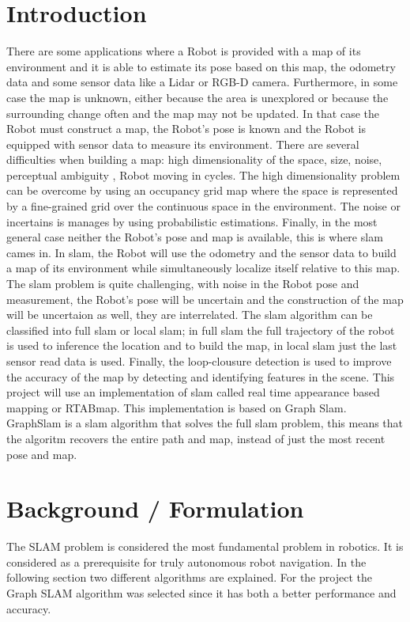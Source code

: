 \documentclass[10pt,journal,compsoc]{IEEEtran}
\begin{document}
\section{Introduction}
\label{sec:introduction}
\IEEEPARstart
{T}{here} are some applications where a Robot is provided with a map of its environment and it is able to estimate its pose based on this map, the odometry data and some sensor data like a Lidar or RGB-D camera. Furthermore, in some case the map is unknown, either because the area is unexplored or because the surrounding change often and the map may not be updated. In that case the Robot must construct a map, the Robot's pose is known and the Robot is equipped with sensor data to measure its environment. There are several difficulties when building a map: high dimensionality of the space, size, noise, perceptual ambiguity , Robot moving in cycles. The  high dimensionality problem can be overcome by using an occupancy grid map where the space is represented by a fine-grained grid over the continuous space in the environment. The noise or incertains is manages by using probabilistic estimations. Finally, in the most general case neither the Robot's pose and map is available, this is where slam cames in. In slam, the Robot will use the odometry and the sensor data to build a map of its environment while simultaneously localize itself relative to this map. The slam problem is quite challenging, with noise in the Robot pose and measurement, the Robot's pose will be uncertain and the construction of the map will be uncertaion as well, they are interrelated. The slam algorithm can be classified into full slam or local slam; in full slam the full trajectory of the robot is used to inference the location and to build the map, in local slam just the last sensor read data is used. Finally, the loop-clousure detection is used to improve the accuracy of the map by detecting and identifying features in the scene. This project will use an implementation of slam called real time appearance based mapping or RTABmap. This implementation is based on Graph Slam. GraphSlam is a slam algorithm that solves the full slam problem, this means that the algoritm recovers the entire path and map, instead of just the most recent pose and map. \cite{udacity} \cite{probabilistic}
\section{Background / Formulation}
The SLAM problem is considered the most fundamental problem in robotics. It is considered as a prerequisite for truly autonomous robot navigation. In the following section two different algorithms are explained. For the project the Graph SLAM algorithm was selected since it has both a better performance and accuracy.
\end{document}
